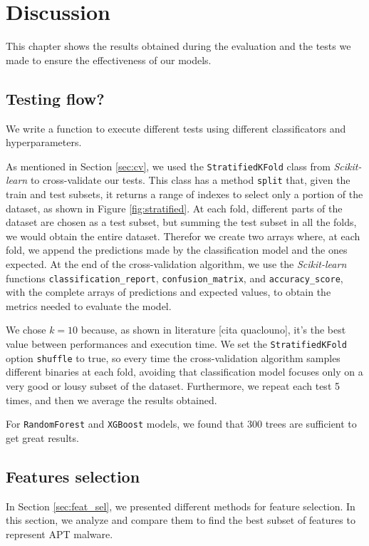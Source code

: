 \chapter{Discussion}

This chapter shows the results obtained during the evaluation and the tests we made to ensure the effectiveness of our models. 

\section{Testing flow?}

We write a function to execute different tests using different classificators and hyperparameters. 

As mentioned in Section \ref{sec:cv}, we used the \texttt{StratifiedKFold} class from \textit{Scikit-learn} to cross-validate our tests. This class has a method \texttt{split} that, given the train and test subsets, it returns a range of indexes to select only a portion of the dataset, as shown in Figure \ref{fig:stratified}.  At each fold, different parts of the dataset are chosen as a test subset, but summing the test subset in all the folds, we would obtain the entire dataset. Therefor we create two arrays where, at each fold, we append the predictions made by the classification model and the ones expected. At the end of the cross-validation algorithm, we use the \textit{Scikit-learn} functions \texttt{classification\_report}, \texttt{confusion\_matrix}, and \texttt{accuracy\_score}, with the complete arrays of predictions and expected values, to obtain the metrics needed to evaluate the model.

We chose $k = 10$ because, as shown in literature [cita quaclouno], it's the best value between performances and execution time. 
We set the \texttt{StratifiedKFold} option \texttt{shuffle} to true, so every time the cross-validation algorithm samples different binaries at each fold, avoiding that classification model focuses only on a very good or lousy subset of the dataset. Furthermore, we repeat each test 5 times, and then we average the results obtained.

For \texttt{RandomForest} and \texttt{XGBoost} models, we found that 300 trees are sufficient to get great results.

\section{Features selection}
In Section \ref{sec:feat_sel}, we presented different methods for feature selection. In this section, we analyze and compare them to find the best subset of features to represent APT malware.

